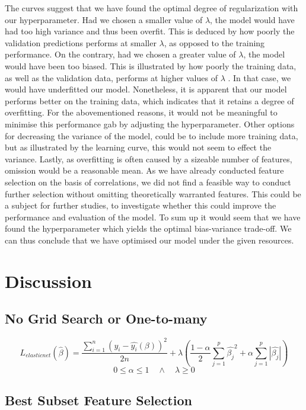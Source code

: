 \documentclass[12pt,a4paper]{article}
\begin{document}
The curves suggest that we have found the optimal degree of regularization with our hyperparameter. Had we chosen a smaller value of $\lambda$, the model would have had too high variance and thus been overfit. This is deduced by how poorly the validation predictions performs at smaller $\lambda$, as opposed to the training performance. On the contrary, had we chosen a greater value of $\lambda$, the model would have been too biased. This is illustrated by how poorly the training data, as well as the validation data, performs at higher values of $\lambda$ . In that case, we would have underfitted our model. 
Nonetheless, it is apparent that our model performs better on the training data, which indicates that it retains a degree of overfitting. For the abovementioned reasons, it would not be meaningful to minimise this performance gab by adjusting the hyperparameter. Other options for decreasing the variance of the model, could be to include more training data, but as illustrated by the learning curve, this would not seem to effect the variance. Lastly, as overfitting is often caused by a sizeable number of features, omission would be a reasonable mean. As we have already conducted feature selection on the basis of correlations, we did not find a feasible way to conduct further selection without omitting theoretically warranted features. This could be a subject for further studies, to investigate whether this could improve the performance and evaluation of the model. \newline
To sum up it would seem that we have found the hyperparameter which yields the optimal bias-variance trade-off. We can thus conclude that we have optimised our model under the given resources. 

\section{Discussion}
\subsection{No Grid Search or One-to-many}
$$L_{elasticnet}(\hat{\beta}) = \frac{\sum_{i=1}^{n}\left(y_i-\hat{y_i}(\beta)\right)^2}{2n} + \lambda\left(\frac{1-\alpha}{2}\sum_{j=1}^{p}\hat{\beta_j}^2+\alpha\sum_{j=1}^{p}|\hat{\beta_j}|\right)$$
$$0 \leq \alpha \leq 1 \quad \wedge \quad \lambda \geq 0$$

\subsection{Best Subset Feature Selection}
\end{document}

